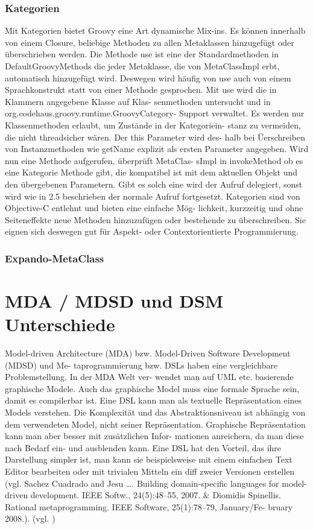 \documentclass[11pt,english,ngerman, headsepline]{scrreprt}
\begin{document}
\subsection{Kategorien}
Mit Kategorien bietet Groovy eine Art dynamische Mix-ins. Es können innerhalb
von einem Closure, beliebige Methoden zu allen Metaklassen hinzugefügt oder
überschrieben werden.
Die Methode use ist eine der Standardmethoden in DefaultGroovyMethods die jeder
Metaklasse, die von MetaClassImpl erbt, automatisch hinzugefügt wird. Deswegen
wird häufig von use auch von einem Sprachkonstrukt statt von einer Methode
gesprochen. Mit use wird die in Klammern angegebene Klasse auf Klas- senmethoden
untersucht und in org.codehaus.groovy.runtime.GroovyCategory- Support verwaltet.
Es werden nur Klassenmethoden erlaubt, um Zustände in der Kategoriein- stanz zu
vermeiden, die nicht threadsicher wären. Der this Parameter wird des- halb bei
Üerschreiben von Instanzmethoden wie getName explizit als ersten Parameter
angegeben. Wird nun eine Methode aufgerufen, überprüft MetaClas- sImpl in
invokeMethod ob es eine Kategorie Methode gibt, die kompatibel ist mit dem
aktuellen Objekt und den übergebenen Parametern. Gibt es solch eine wird der
Aufruf delegiert, sonst wird wie in 2.5 beschrieben der normale Aufruf
fortgesetzt.
Kategorien sind von Objective-C entlehnt und bieten eine einfache Mög-
lichkeit, kurzzeitig und ohne Seiteneffekte neue Methoden hinzuzufügen oder
bestehende zu überschreiben. Sie eignen sich deswegen gut für Aspekt- oder
Contextorientierte Programmierung. \cite{mpInGroovy}
\subsection{Expando-MetaClass}


\chapter{MDA / MDSD und DSM Unterschiede} 
Model-driven Architecture (MDA) bzw. Model-Driven Software Development (MDSD)
und Me- taprogrammierung bzw. DSLs haben eine vergleichbare Problemstellung. In
der MDA Welt ver- wendet man auf UML etc. basierende graphische Modele. Auch das
graphische Model muss eine formale Sprache sein, damit es compilerbar ist. Eine
DSL kann man als textuelle Repräsentation eines Models verstehen.
Die Komplexität und das Abstraktionsniveau ist abhängig von dem verwendeten
Model, nicht seiner Repräsentation. Graphische Repräsentation kann man aber
besser mit zusätzlichen Infor- mationen anreichern, da man diese nach Bedarf
ein- und ausblenden kann.
Eine DSL hat den Vorteil, das ihre Darstellung simpler ist, man kann sie
beispielsweise mit einem einfachen Text Editor bearbeiten oder mit trivialen
Mitteln ein diff zweier Versionen erstellen (vgl. Sachez Cuadrado and
Jesu \ldots. Building domain-specific languages for model-driven
development. IEEE Softw., 24(5):48–55, 2007. \& Diomidis Spinellis. Rational
metaprogramming. IEEE Software, 25(1):78–79, January/Fe- bruary 2008.).
 (vgl. \cite{biekermetaprogrammierung})
 
\end{document}
